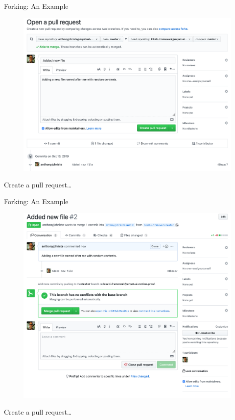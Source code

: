 \documentclass{beamer}
\begin{document}
    \begin{frame}{Forking: An Example}
        \begin{figure}
            \centering
            \includegraphics[width=\textwidth]{figures/pr_3.png}
        \end{figure}
        \centering
        Create a pull request\ldots
    \end{frame}

    \begin{frame}{Forking: An Example}
        \begin{figure}
            \centering
            \includegraphics[width=\textwidth]{figures/pr_4.png}
        \end{figure}
        \centering
        Create a pull request\ldots
    \end{frame}
\end{document}
